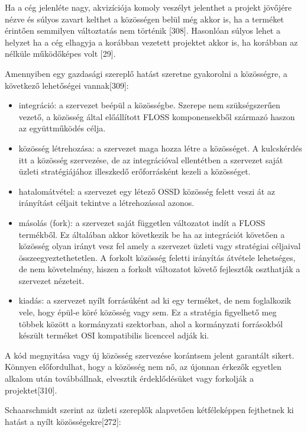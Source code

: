 \documentclass[12pt,magyar,a4paper,oneside]{scrreprt}
\providecommand{\tightlist}{%
  \setlength{\itemsep}{0pt}\setlength{\parskip}{0pt}}
\begin{document}
Ha a cég jelenléte nagy, akvizíciója komoly veszélyt jelenthet a projekt
jövőjére nézve és súlyos zavart kelthet a közösségen belül még akkor is,
ha a terméket érintően semmilyen változtatás nem történik {[}308{]}.
Hasonlóan súlyos lehet a helyzet ha a cég elhagyja a korábban vezetett
projektet akkor is, ha korábban az nélküle működőképes volt {[}29{]}.

Amennyiben egy gazdasági szereplő hatást szeretne gyakorolni a
közösségre, a következő lehetőségei vannak{[}309{]}:

\begin{itemize}
\tightlist
\item
  integráció: a szervezet beépül a közösségbe. Szerepe nem
  szükségszerűen vezető, a közösség által előállított FLOSS
  komponensekből származó haszon az együttműködés célja.
\item
  közösség létrehozása: a szervezet maga hozza létre a közösséget. A
  kulcskérdés itt a közösség szervezése, de az integrációval ellentétben
  a szervezet saját üzleti stratégiájához illeszkedő erőforrásként
  kezeli a közösséget.
\item
  hatalomátvétel: a szervezet egy létező OSSD közösség felett veszi át
  az irányítást céljait tekintve a létrehozással azonos.
\item
  másolás (fork): a szervezet saját független változatot indít a FLOSS
  termékből. Ez általában akkor következik be ha az integrációt követően
  a közösség olyan irányt vesz fel amely a szervezet üzleti vagy
  stratégiai céljaival összeegyeztethetetlen. A forkolt közösség feletti
  irányítás átvétele lehetséges, de nem követelmény, hiszen a forkolt
  változatot követő fejlesztők oszthatják a szervezet nézeteit.
\item
  kiadás: a szervezet nyílt forrásúként ad ki egy terméket, de nem
  foglalkozik vele, hogy épül-e köré közösség vagy sem. Ez a stratégia
  figyelhető meg többek között a kormányzati szektorban, ahol a
  kormányzati forrásokból készült terméket OSI kompatibilis licenccel
  adják ki.
\end{itemize}

A kód megnyitása vagy új közösség szervezése korántsem jelent garantált
sikert. Könnyen előfordulhat, hogy a közösség nem nő, az újonnan érkezők
egyetlen alkalom után továbbállnak, elvesztik érdeklődésüket vagy
forkolják a projektet{[}310{]}.

Schaarschmidt szerint az üzleti szereplők alapvetően kétféleképpen
fejthetnek ki hatást a nyílt közösségekre{[}272{]}:
\end{document}
